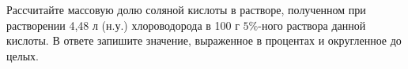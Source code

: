 
Рассчитайте
массовую долю соляной кислоты в растворе, полученном при растворении 4,48 л (н.у.)
хлороводорода в 100 г $5\%$-ного раствора данной кислоты. В ответе запишите
значение, выраженное в процентах и округленное до целых.

